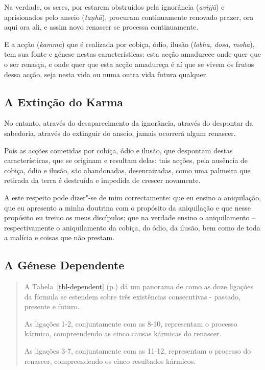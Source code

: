 Na verdade, os seres, por estarem obstruídos pela ignorância (\emph{avijjā}) e
aprisionados pelo anseio (\emph{taṇhā}), procuram continuamente renovado prazer,
ora aqui ora ali, e assim novo renascer se processa continuamente.


E a acção (\emph{kamma}) que é realizada por cobiça, ódio, ilusão (\emph{lobha, dosa, moha}), tem sua fonte e génese nestas características: esta acção amadurece onde quer que o ser renasça, e onde quer que esta acção amadureça é aí que se vivem os frutos dessa acção, seja nesta vida ou numa outra vida futura qualquer.


\subsection{A Extinção do Karma}

No entanto, através do desaparecimento da ignorância, através do despontar da
sabedoria, através do extinguir do anseio, jamais ocorrerá algum renascer.


Pois as acções cometidas por cobiça, ódio e ilusão, que despontam destas
características, que se originam e resultam delas: tais acções, pela ausência de
cobiça, ódio e ilusão, são abandonadas, desenraizadas, como uma palmeira que
retirada da terra é destruída e impedida de crescer novamente.


A este respeito pode dizer"-se de mim correctamente: que eu ensino a aniquilação,
que eu apresento a minha doutrina com o propósito da aniquilação e que nesse
propósito eu treino os meus discípulos; que na verdade ensino o aniquilamento --
respectivamente o aniquilamento da cobiça, do ódio, da ilusão, bem como de toda
a malícia e coisas que não prestam.


\subsection{A Génese Dependente}

\begin{quote}
  A Tabela~\ref{tbl-dependent} (p.\pageref{tbl-dependent}) dá um panorama de
  como as doze ligações da fórmula se estendem sobre três existências
  consecutivas - passado, presente e futuro.

  As ligações 1-2, conjuntamente com as 8-10, representam o processo kármico,
  compreendendo as cinco causas kármicas do renascer.

  As ligações 3-7, conjuntamente com as 11-12, representam o processo do
  renascer, compreendendo os cinco resultados kármicos.
\end{quote}

